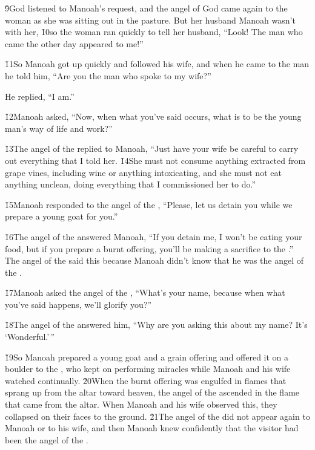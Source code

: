 \v{9}God listened to Manoah's request, and the angel of God came again to the woman as she was sitting out in the pasture. But her husband Manoah wasn't with her, \v{10}so the woman ran quickly to tell her husband, ``Look! The man who came the other day appeared to me!''

\v{11}So Manoah got up quickly and followed his wife, and when he came to the man he told him, ``Are you the man who spoke to my wife?''

He replied, ``I am.''

\v{12}Manoah asked, ``Now, when what you've said occurs, what is to be the young man's way of life and work?''

\v{13}The angel of the  replied to Manoah, ``Just have your wife be careful to carry out everything that I told her. \v{14}She must not consume anything extracted from grape vines, including wine or anything intoxicating, and she must not eat anything unclean, doing everything that I commissioned her to do.''

\v{15}Manoah responded to the angel of the , ``Please, let us detain you while we prepare a young goat for you.''

\v{16}The angel of the  answered Manoah, ``If you detain me, I won't be eating your food, but if you prepare a burnt offering, you'll be making a sacrifice to the .'' The angel of the  said this because Manoah didn't know that he was the angel of the .

\v{17}Manoah asked the angel of the , ``What's your name, because when what you've said happens, we'll glorify you?''

\v{18}The angel of the  answered him, ``Why are you asking this about my name? It's `Wonderful.'\,''

\v{19}So Manoah prepared a young goat and a grain offering and offered it on a boulder to the , who kept on performing miracles while Manoah and his wife watched continually. \v{20}When the burnt offering was engulfed in flames that sprang up from the altar toward heaven, the angel of the  ascended in the flame that came from the altar. When Manoah and his wife observed this, they collapsed on their faces to the ground. \v{21}The angel of the  did not appear again to Manoah or to his wife, and then Manoah knew confidently that the visitor had been the angel of the .

